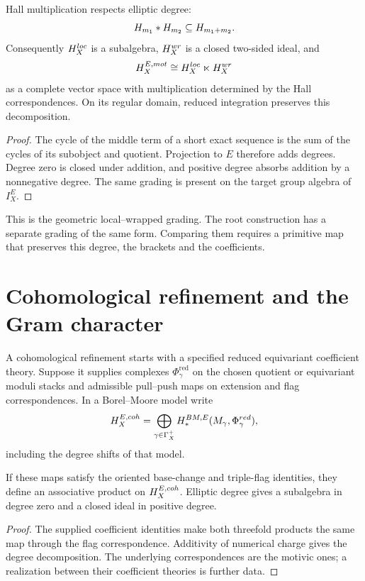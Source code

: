 \begin{theorem}
Hall multiplication respects elliptic degree:
\[
 H_{m_1}*H_{m_2}\subseteq H_{m_1+m_2}.
\]
Consequently $H_X^{loc}$ is a subalgebra, $H_X^{wr}$ is a closed two-sided ideal, and
\[
 H_X^{E,mot}
 \cong
 H_X^{loc}\ltimes H_X^{wr}
\]
as a complete vector space with multiplication determined by the Hall correspondences.  On its regular domain, reduced integration preserves this decomposition.
\end{theorem}
\begin{proof}
The cycle of the middle term of a short exact sequence is the sum of the cycles of its subobject and quotient.  Projection to $E$ therefore adds degrees.  Degree zero is closed under addition, and positive degree absorbs addition by a nonnegative degree.  The same grading is present on the target group algebra of $I_X^E$.
\end{proof}

This is the geometric local--wrapped grading. The root construction
has a separate grading of the same form. Comparing them requires a
primitive map that preserves this degree, the brackets and the coefficients.

\section{Cohomological refinement and the Gram character}
A cohomological refinement starts with a specified reduced equivariant
coefficient theory. Suppose it supplies complexes $\Phi^{\mathrm{red}}_\gamma$
on the chosen quotient or equivariant moduli stacks and admissible
pull--push maps on extension and flag correspondences. In a Borel--Moore
model write
\[
 H_X^{E,coh}=
 \bigoplus_{\gamma\in\Gamma_X^+}
 H_*^{BM,E}(M_\gamma,\Phi^{red}_\gamma),
\]
including the degree shifts of that model.

\begin{theorem}
If these maps satisfy the oriented base-change and triple-flag
identities, they define an associative product on
$H_X^{E,coh}$. Elliptic degree gives a subalgebra in
degree zero and a closed ideal in positive degree.
\end{theorem}
\begin{proof}
The supplied coefficient identities make both threefold products the
same map through the flag correspondence. Additivity of numerical
charge gives the degree decomposition. The underlying correspondences
are the motivic ones; a realization between their coefficient theories
is further data.
\end{proof}

